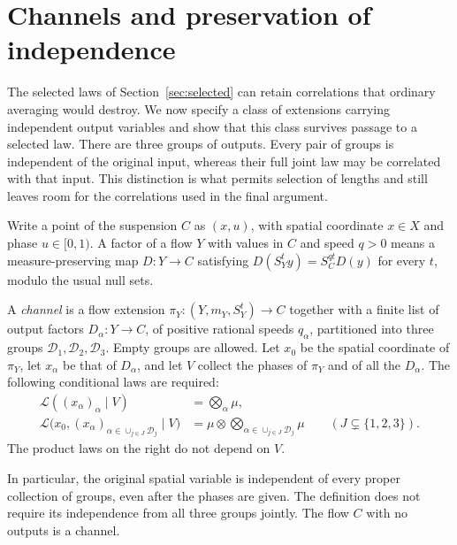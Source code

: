 \section{Channels and preservation of independence}
\label{sec:channels}

The selected laws of Section~\ref{sec:selected} can retain correlations
that ordinary averaging would destroy.  We now specify a class of
extensions carrying independent output variables and show that this
class survives passage to a selected law.  There are three groups of
outputs.  Every pair of groups is independent of the original input,
whereas their full joint law may be correlated with that input.  This
distinction is what permits selection of lengths and still leaves room
for the correlations used in the final argument.

Write a point of the suspension $C$ as $(x,u)$, with spatial coordinate
$x\in X$ and phase $u\in[0,1)$.  A factor of a flow $Y$ with values in
$C$ and speed $q>0$ means a measure-preserving map $D:Y\to C$ satisfying
$D(S_Y^t y)=S_C^{qt}D(y)$ for every $t$, modulo the usual null sets.

\begin{definition}\label{def:channel}
A \emph{channel} is a flow extension
$\pi_Y:(Y,m_Y,S_Y^t)\to C$ together with a finite list of output factors
$D_\alpha:Y\to C$, of positive rational speeds $q_\alpha$, partitioned
into three groups $\mathcal D_1,\mathcal D_2,\mathcal D_3$.
Empty groups are allowed.  Let $x_0$ be the spatial coordinate of
$\pi_Y$, let $x_\alpha$ be that of $D_\alpha$, and let $V$ collect
the phases of $\pi_Y$ and of all the $D_\alpha$.  The following
conditional laws are required:
\begin{align}
 \mathcal L((x_\alpha)_\alpha\mid V)
       &=\bigotimes_\alpha\mu,
                  \label{eq:channel-all}\\
 \mathcal L\bigl(x_0,(x_\alpha)_{\alpha\in\cup_{j\in J}\mathcal D_j}
                  \mid V\bigr)
       &=\mu\otimes
          \bigotimes_{\alpha\in\cup_{j\in J}\mathcal D_j}\mu
       \qquad(J\subsetneq\{1,2,3\}).
                  \label{eq:channel-proper}
\end{align}
The product laws on the right do not depend on $V$.
\end{definition}

In particular, the original spatial variable is independent of every
proper collection of groups, even after the phases are given.  The
definition does not require its independence from all three groups
jointly.  The flow $C$ with no outputs is a channel.


